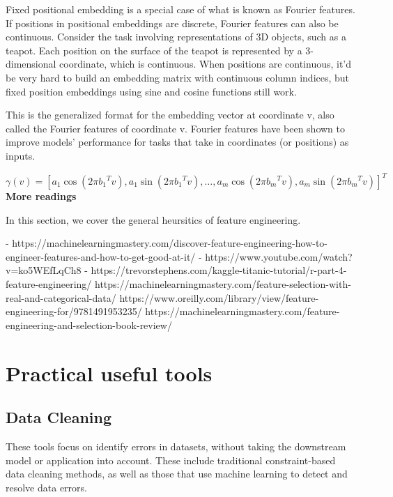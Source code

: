 \documentclass[openany]{book}
\begin{document}
Fixed positional embedding is a special case of what is known as Fourier features. If positions in positional embeddings are discrete, Fourier features can also be continuous. Consider the task involving representations of 3D objects, such as a teapot. Each position on the surface of the teapot is represented by a 3-dimensional coordinate, which is continuous. When positions are continuous, it’d be very hard to build an embedding matrix with continuous column indices, but fixed position embeddings using sine and cosine functions still work.

This is the generalized format for the embedding vector at coordinate v, also called the Fourier features of coordinate v. Fourier features have been shown to improve models’ performance for tasks that take in coordinates (or positions) as inputs.


$$\gamma(v) = [a_1 \cos(2\pi{b_1}^Tv), a_1\sin(2\pi{b_1}^Tv), …, a_m\cos(2\pi{b_m}^Tv), a_m\sin(2\pi{b_m}^Tv)]^T$$
\textbf{More readings}

In this section, we cover the general heursitics of feature engineering. 

- https://machinelearningmastery.com/discover-feature-engineering-how-to-engineer-features-and-how-to-get-good-at-it/
- https://www.youtube.com/watch?v=ko5WEfLqCh8 
- https://trevorstephens.com/kaggle-titanic-tutorial/r-part-4-feature-engineering/
https://machinelearningmastery.com/feature-selection-with-real-and-categorical-data/ 
https://www.oreilly.com/library/view/feature-engineering-for/9781491953235/
https://machinelearningmastery.com/feature-engineering-and-selection-book-review/ 











\section{Practical useful tools}


\subsection{Data Cleaning}


These tools focus on identify errors in datasets, without taking the downstream model or application into account. These include traditional constraint-based data cleaning methods, as well as those that use machine learning to detect and resolve data errors.
\end{document}
